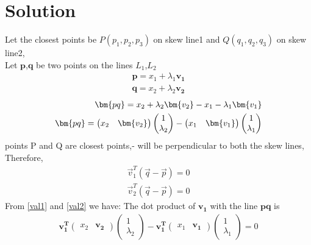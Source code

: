 \documentclass[journal,12pt,twocolumn]{IEEEtran}
\begin{document}
\section{Solution}
\begin{flushleft}

Let the closest points be \(P(p_1,p_2,p_3)\) on skew line1 and \(Q(q_1,q_2,q_3)\) on skew line2,\\

Let $\bm{p}$,$\bm{q}$ be two points on the lines $L_1$,$L_2$ 
\begin{align}
    \bm{p}=x_1+\lambda_1\bm{v_1}\\
    \bm{q}=x_2+\lambda_2\bm{v_2}
\end{align}
\begin{align}
    \bm{pq}=x_2+\lambda_2\bm{v_2}-x_1-\lambda_1\bm{v_1}\notag\\
    \bm{pq}=\begin{pmatrix}x_2& \bm{v_2}\end{pmatrix}\begin{pmatrix}1 \\ \lambda_2\end{pmatrix}-\begin{pmatrix}x_1 & \bm{v_1}\end{pmatrix}\begin{pmatrix}1 \\ \lambda_1\end{pmatrix}
\end{align}
points P and Q are closest points,- will be perpendicular to both the skew lines,\\
Therefore,
\begin{align}\label{val1}
    \vec{v}_1^T(\vec{q}-\vec{p}) = 0
\end{align}
\begin{align}\label{val2}
    \vec{v}_2^T(\vec{q}-\vec{p}) = 0
\end{align}
From \ref{val1} and \ref{val2} we have:
The dot product of $\bm{v_1}$ with the line $\bm{pq}$ is
\begin{align}\label{eq1}
    \bm{v_1^T}\begin{pmatrix}x_2 & \bm{v_2}\end{pmatrix}\begin{pmatrix}1 \\ \lambda_2\end{pmatrix}-\bm{v_1^T}\begin{pmatrix}x_1 & \bm{v_1}\end{pmatrix}\begin{pmatrix}1 \\ \lambda_1\end{pmatrix}=0

\end{align}
\end{flushleft}
\end{document}
